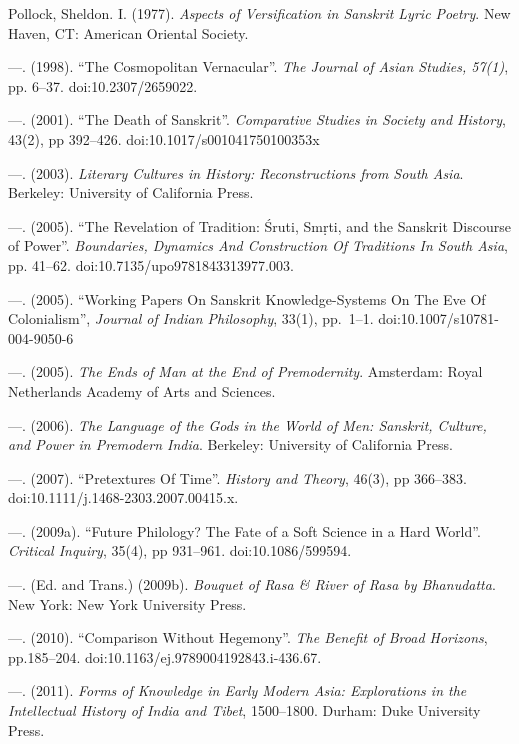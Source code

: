 \begin{thebibliography}{99}
  Pollock, Sheldon. I. (1977). \textit{Aspects of Versification in Sanskrit Lyric Poetry}. New Haven, CT: American Oriental Society.

  —. (1998). “The Cosmopolitan Vernacular”. \textit{The Journal of Asian Studies, 57(1)}, pp. 6--37. doi:10.2307/2659022.

  —. (2001). “The Death of Sanskrit”. \textit{Comparative Studies in Society and History}, 43(2), pp 392--426. doi:10.1017/s001041750100353x

  —. (2003). \textit{Literary Cultures in History: Reconstructions from South Asia}. Berkeley: University of California Press.

  —. (2005). “The Revelation of Tradition: Śruti, Smṛti, and the Sanskrit Discourse of Power”. \textit{Boundaries, Dynamics And Construction Of Traditions In South Asia}, pp. 41--62. doi:10.7135/upo9781843313977.003.

  —. (2005). “Working Papers On Sanskrit Knowledge-Systems On The Eve Of Colonialism”, \textit{Journal of Indian Philosophy}, 33(1), pp.~1--1. doi:10.1007/s10781-004-9050-6

  —. (2005). \textit{The Ends of Man at the End of Premodernity}. Amsterdam: Royal Netherlands Academy of Arts and Sciences.

  —. (2006). \textit{The Language of the Gods in the World of Men: Sanskrit, Culture, and Power in Premodern India}. Berkeley: University of California Press.

  —. (2007). “Pretextures Of Time”. \textit{History and Theory}, 46(3), pp 366--383. doi:10.1111/j.1468-2303.2007.00415.x.

  —. (2009a). “Future Philology? The Fate of a Soft Science in a Hard World”. \textit{Critical Inquiry}, 35(4), pp 931--961. doi:10.1086/599594.

  —. (Ed. and Trans.) (2009b). \textit{Bouquet of Rasa \& River of Rasa by Bhanudatta}. New York: New York University Press.

  —. (2010). “Comparison Without Hegemony”. \textit{The Benefit of Broad Horizons}, pp.185--204. doi:10.1163/ej.9789004192843.i-436.67.

  —. (2011). \textit{Forms of Knowledge in Early Modern Asia: Explorations in the Intellectual History of India and Tibet}, 1500--1800. Durham: Duke University Press.


\end{thebibliography}
